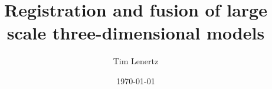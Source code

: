 \documentclass[a4paper,10pt]{scrreprt}
\begin{document}
\title{Registration and fusion of large scale three-dimensional models}
\author{Tim Lenertz}
\date{\today}
\maketitle

\tableofcontents







\appendix





\end{document}
